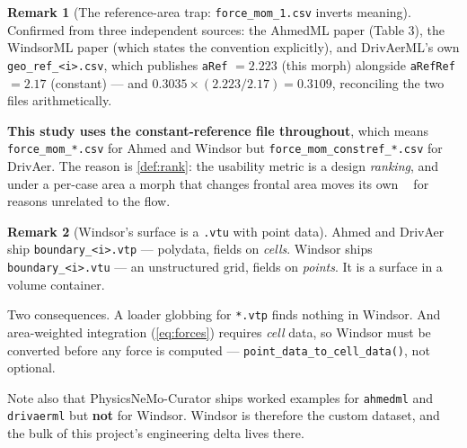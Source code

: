 \documentclass[10pt,a4paper]{article}
\theoremstyle{definition}
\newtheorem{remark}{Remark}[section]
\DeclareMathOperator{\Cd}{C_d}
\begin{document}
\begin{remark}[The reference-area trap: \texttt{force\_mom\_1.csv} inverts meaning]
Confirmed from three independent sources: the AhmedML paper (Table 3), the WindsorML
paper (which states the convention explicitly), and DrivAerML's own
\texttt{geo\_ref\_<i>.csv}, which publishes \texttt{aRef} $=2.223$ (this morph) alongside
\texttt{aRefRef} $=2.17$ (constant) --- and $0.3035 \times (2.223/2.17) = 0.3109$,
reconciling the two files arithmetically.

\textbf{This study uses the constant-reference file throughout}, which means
\texttt{force\_mom\_*.csv} for Ahmed and Windsor but
\texttt{force\_mom\_constref\_*.csv} for DrivAer. The reason is \cref{def:rank}: the
usability metric is a design \emph{ranking}, and under a per-case area a morph that
changes frontal area moves its own $\Cd$ for reasons unrelated to the flow.
\end{remark}

\begin{remark}[Windsor's surface is a \texttt{.vtu} with point data]
\label{rem:windsorfmt}
Ahmed and DrivAer ship \texttt{boundary\_<i>.vtp} --- polydata, fields on \emph{cells}.
Windsor ships \texttt{boundary\_<i>.vtu} --- an unstructured grid, fields on
\emph{points}. It is a surface in a volume container.

Two consequences. A loader globbing for \texttt{*.vtp} finds nothing in Windsor. And
area-weighted integration (\cref{eq:forces}) requires \emph{cell} data, so Windsor must
be converted before any force is computed --- \texttt{point\_data\_to\_cell\_data()}, not
optional.

Note also that PhysicsNeMo-Curator ships worked examples for \texttt{ahmedml} and
\texttt{drivaerml} but \textbf{not} for Windsor. Windsor is therefore the custom dataset,
and the bulk of this project's engineering delta lives there.
\end{remark}
\end{document}
